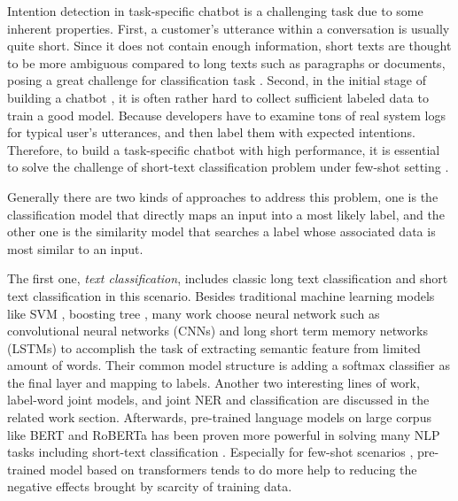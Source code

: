 \documentclass[letterpaper]{article} %
\begin{document}
  Intention detection in task-specific chatbot  is  a  challenging task due to some inherent properties. First,
  a customer's  utterance  within  a conversation is usually quite short. Since it
  does  not  contain  enough  information,  short  texts \cite{song2014short} are
  thought  to  be  more  ambiguous  compared to long texts such as paragraphs or
  documents,  posing  a  great challenge \cite{chen2019deep} for classification
  task   \cite{phan2008learning,yan2009dynamic,hua2015short}.   Second,  in  the
  initial  stage  of  building  a  chatbot  , it is often rather hard to collect
  sufficient  labeled  data  to  train  a good model. Because developers have to
  examine tons of real system logs for typical user's utterances, and then label
  them  with expected intentions. Therefore, to build a task-specific chatbot with
  high  performance, it is essential to solve the challenge of short-text
  classification   \cite{sriram2010short}   problem   under   few-shot   setting
  \cite{yu2018diverse}.


  Generally  there  are  two  kinds  of  approaches  to  address  this  problem,
  one is the classification model that directly maps an input into a most likely label, and
  the other one is the similarity  model  that searches a label whose associated data is most similar to
  an input.


  The   first  one,  \emph{text  classification},  includes  classic  long  text
  classification  and  short  text  classification  in  this  scenario.  Besides
  traditional  machine  learning  models  like  SVM \cite{suykens1999least},  
  boosting  tree \cite{tu2005probabilistic},  many work
  \cite{wen2016network}  choose  neural  network  such  as  convolutional neural
  networks (CNNs) \cite{kim2014convolutional,zhang2015character,conneau2016very}
  and       long       short       term       memory       networks      (LSTMs)
  \cite{mousa2017contextual,liu2016recurrent}   to   accomplish   the   task  of
  extracting  semantic  feature from limited amount of words. Their common model
  structure  is  adding  a  softmax classifier as the final layer and mapping to
  labels.  Another  two  interesting lines of work, label-word joint models, and
  joint  NER  and  classification  are  discussed  in  the related work section.
  Afterwards,   pre-trained   language   models   on   large  corpus  like  BERT
  \cite{devlin2018bert}  and  RoBERTa \cite{liu2019roberta} has been proven more
  powerful  in  solving  many  NLP  tasks  including  short-text  classification
  \cite{madabushi2020cost}.      Especially      for      few-shot     scenarios
  \cite{yu2018diverse},     pre-trained     model    based    on    transformers
  \cite{vaswani2017attention} tends to do more
  help to reducing the negative effects brought by scarcity of training data.
\end{document}
